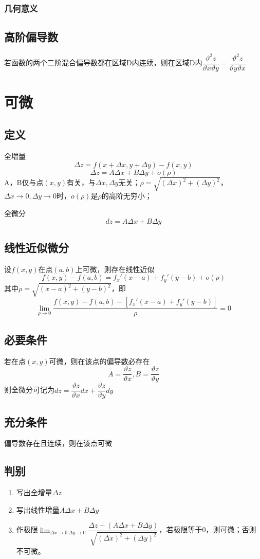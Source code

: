 \subsubsection{几何意义}


\subsection{高阶偏导数}
若函数的两个二阶混合偏导数都在区域D内连续，则在区域D内\(\dfrac{\vartheta^2z}{\vartheta x\vartheta y} = \dfrac{\vartheta^2z}{\vartheta y\vartheta x}\)


\section{可微}

\subsection{定义}
全增量\[\Delta z = f(x + \Delta x, y + \Delta y) - f(x, y)\]
\[\Delta z = A\Delta x + B\Delta y + o(\rho)\]
A，B仅与点\((x, y)\)有关，与\(\Delta x,\Delta y\)无关；\(\rho = \sqrt{(\Delta x)^2 + (\Delta y)^2}\)，\(\Delta x \to 0,\Delta y \to 0\)时，\(o(\rho)\)是\(\rho\)的高阶无穷小；

全微分\[dz = A\Delta x + B\Delta y\]


\subsection{线性近似微分}
设\(f(x, y)\)在点\((a, b)\)上可微，则存在线性近似\[f(x, y) - f(a, b) = f_x'(x - a) + f_y'(y - b) + o(\rho)\]
其中\(\rho = \sqrt{(x - a)^2 + (y - b)^2}\)，即\[\lim_{\rho \to 0}\dfrac{f(x, y) - f(a, b) - [f_x'(x - a) + f_y'(y - b)]}{\rho} = 0\]


\subsection{必要条件}
若在点\((x, y)\)可微，则在该点的偏导数必存在\[A = \dfrac{\vartheta z}{\vartheta x}, B = \dfrac{\vartheta z}{\vartheta y}\]
则全微分可记为\(dz = \dfrac{\vartheta z}{\vartheta x}dx + \dfrac{\vartheta z}{\vartheta y}dy\)


\subsection{充分条件}
偏导数存在且连续，则在该点可微


\subsection{判别}
\begin{enumerate}
    \item 写出全增量\(\Delta z\)
    \item 写出线性增量\(A\Delta x + B\Delta y\)
    \item 作极限\(\displaystyle\lim_{\Delta x \to 0\ \Delta y \to 0}\dfrac{\Delta z - (A\Delta x + B\Delta y)}{\sqrt{(\Delta x)^2 + (\Delta y)^2}}\)，若极限等于0，则可微；否则不可微。
\end{enumerate}



